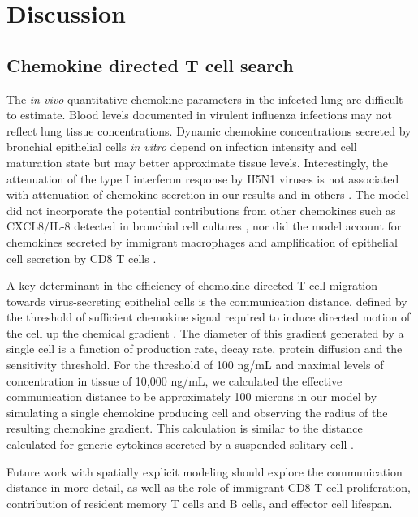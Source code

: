 \documentclass[10pt]{article}
\begin{document}
\section{Discussion}

\subsection{Chemokine directed T cell search}

The \textit{in vivo} quantitative chemokine parameters in the infected lung are difficult to estimate.  Blood levels documented in virulent influenza infections \cite{DeJong2006} may not reflect lung tissue concentrations.  Dynamic chemokine concentrations secreted by bronchial epithelial cells \textit{in vitro} depend on infection intensity and cell maturation state \cite{Mitchell2011, Chan2010, Chan2005, Zeng2011} but may better approximate tissue levels.  Interestingly, the attenuation of the type I interferon response by H5N1 viruses is not associated with attenuation of chemokine secretion in our results and in others \cite{Zeng2007}.  The model did not incorporate the potential contributions from other chemokines such as CXCL8/IL-8 detected in bronchial cell cultures \cite{Matsukura1996, Arndt2002}, nor did the model account for chemokines secreted by immigrant macrophages \cite{Julkunen2000} and amplification of epithelial cell secretion by CD8 T cells \cite{Zhao2000}.

A key determinant in the efficiency of chemokine-directed T cell migration towards virus-secreting epithelial cells is the communication distance, defined by the threshold of sufficient chemokine signal required to induce directed motion of the cell up the chemical gradient \cite{Thelen2008}.  The diameter of this gradient generated by a single cell is a function of production rate, decay rate, protein diffusion and the sensitivity threshold.  For the threshold of 100 ng/mL and maximal levels of concentration in tissue of 10,000 ng/mL, we calculated the effective communication distance to be approximately 100 microns in our model by simulating a single chemokine producing cell and observing the radius of the resulting chemokine gradient.  This calculation is similar to the distance calculated for generic cytokines secreted by a suspended solitary cell \cite{Francis1997}.  

Future work with spatially explicit modeling should explore the communication distance in more detail, as well as the role of immigrant CD8 T cell proliferation, contribution of resident memory T cells and B cells, and effector cell lifespan. 
\end{document}
